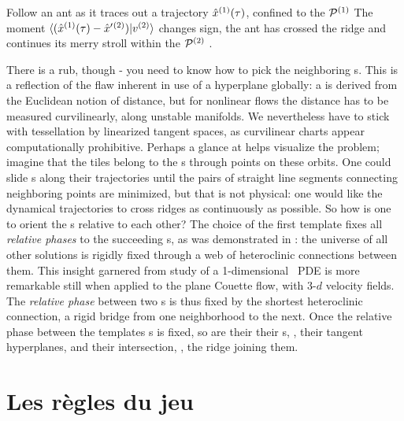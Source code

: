 Follow an ant as it traces out a trajectory
$\hat{x}{}^{(1)}(\tau)$, confined to the {\PoincSec} $\mathcal{P}{}^{(1)}$
The
moment $\braket{(\sspRed{}^{(1)}(\tau)-\slicep{}^{(2)})}{\vel{}{}^{(2)}}$ changes
sign, the ant has crossed the ridge and  continues its merry stroll within the
$\mathcal{P}{}^{(2)}$ {\PoincSec}.

There is a rub, though - you need to know how to pick the
neighboring {\template s}. This is a reflection of the flaw inherent in use
of a {\PoincSec} hyperplane globally: a {\PoincSec} is derived from the Euclidean
notion of distance, but for nonlinear flows the distance has to be
measured curvilinearly, along unstable
manifolds. We nevertheless have to stick with
tessellation by linearized tangent spaces, as curvilinear charts appear
computationally prohibitive. Perhaps a glance at
 helps visualize the problem; imagine that the
tiles belong to the
{\PoincSec s} through {\template} points on these orbits. One could slide
{\template s} along their trajectories until the pairs of straight line
segments connecting neighboring {\template} points are minimized, but
that is not physical: one would like the dynamical trajectories to cross
ridges as continuously as possible. So how is one to orient
the {\template s} relative to each other? The choice of the first template fixes all {\em
relative phases} to the succeeding {\template s}, as was demonstrated in
: the universe of all other solutions is rigidly fixed
through a web of heteroclinic connections between them. This insight
garnered from study of a 1-dimensional \KS\ PDE is more remarkable still
when applied to the plane Couette flow, with 3-$d$ velocity
fields. The {\em relative phase} between
two {\template s} is thus fixed  by the shortest heteroclinic connection,
a rigid bridge from one neighborhood to the next. Once the relative phase
between the templates {\template s} is fixed, so are their their {\PoincSec s},
\ie, their tangent hyperplanes, and their intersection, \ie, the  ridge
joining them.

\section{Les r\`egles du jeu}
    \label{sec:defs}


